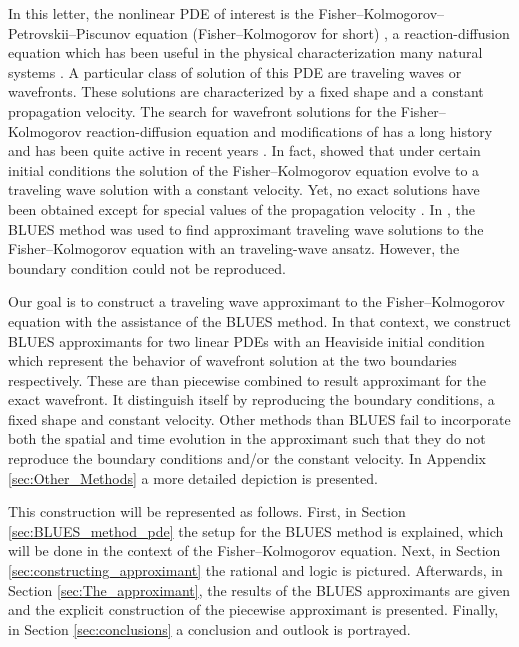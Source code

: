 \documentclass[amsmath,amssymb,amsfonts,aps,pre,preprint,superscriptaddress,bibnotes,showpacs,showkeys,longbibliography]{revtex4-1}
\begin{document}
In this letter, the nonlinear PDE of interest is the Fisher–Kolmogorov–Petrovskii–Piscunov equation (Fisher–Kolmogorov for short) \cite{fisher1937wave, kolmogorov1937study}, a reaction-diffusion equation which has been useful in the physical characterization many natural systems \cite{canosa1973nonlinear,ross2010generalized,hamel2011speedup, gueron1989model, Bewick2017Invasion}. A particular class of solution of this PDE are traveling waves or wavefronts. These solutions are characterized by a fixed shape and a constant propagation velocity. The search for wavefront solutions for the Fisher–Kolmogorov reaction-diffusion equation and modifications of has a long history and has been quite active in recent years \cite{Mishra2012,Mansour2010,Yuan2013general}. In fact, \citet{kolmogorov1937study} showed that under certain initial conditions the solution of the Fisher–Kolmogorov equation evolve to a traveling wave solution with a constant velocity. Yet, no exact solutions have been obtained except for special values of the propagation velocity \cite{Ablowitz1979}. In \citet{Berx_2020}, the BLUES method was used to find approximant traveling wave solutions to the Fisher–Kolmogorov equation with an traveling-wave ansatz. However, the boundary condition could not be reproduced. %

Our goal is to construct a traveling wave approximant to the Fisher–Kolmogorov equation with the assistance of the BLUES method. In that context, we construct BLUES approximants for two linear PDEs with an Heaviside initial condition which represent the behavior of wavefront solution at the two boundaries respectively. These are than piecewise combined to result approximant for the exact wavefront. It distinguish itself by reproducing the boundary conditions, a fixed shape and constant velocity. Other methods than BLUES fail to incorporate both the spatial and time evolution in the approximant such that they do not reproduce the boundary conditions and/or the constant velocity. In Appendix \ref{sec:Other_Methods} a more detailed depiction is presented.

This construction will be represented as follows. First, in Section \ref{sec:BLUES_method_pde} the setup for the BLUES method is explained, which will be done in the context of the Fisher–Kolmogorov equation. Next, in Section \ref{sec:constructing_approximant} the rational and logic is pictured. Afterwards, in Section \ref{sec:The_approximant}, the results of the BLUES approximants are given and the explicit construction of the piecewise approximant is presented. Finally, in Section \ref{sec:conclusions} a conclusion and outlook is portrayed.
\end{document}
